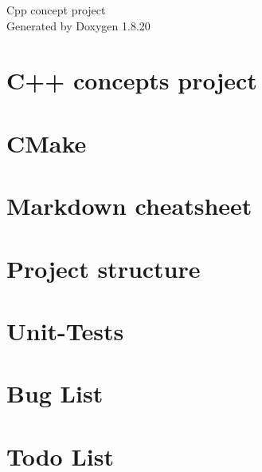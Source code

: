 \let\mypdfximage\pdfximage\def\pdfximage{\immediate\mypdfximage}\documentclass[twoside]{book}
\newcommand{\+}{\discretionary{\mbox{\scriptsize$\hookleftarrow$}}{}{}}
\newcommand{\clearemptydoublepage}{%
  \newpage{\pagestyle{empty}\cleardoublepage}%
}
\begin{document}
\hypersetup{pageanchor=false,
             bookmarksnumbered=true,
             pdfencoding=unicode
            }
\begin{titlepage}
\vspace*{7cm}
\begin{center}%
{\Large Cpp concept project }\\
\vspace*{1cm}
{\large Generated by Doxygen 1.8.20}\\
\end{center}
\end{titlepage}
\clearemptydoublepage
{}
\tableofcontents
\clearemptydoublepage
{}
\hypersetup{pageanchor=true}

\chapter{C++ concepts project}
\label{index}\hypertarget{index}{}
\chapter{C\+Make}
\label{md_documents__c_make_introduction}

\chapter{Markdown cheatsheet}
\label{md_documents__markdown}

\chapter{Project structure}
\label{md_documents_structure}

\chapter{Unit-\/\+Tests}
\label{md_documents__unit-_tests}

\chapter{Bug List}
\label{bug}

\chapter{Todo List}
\label{todo}

\end{document}
